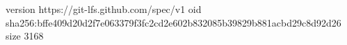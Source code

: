 version https://git-lfs.github.com/spec/v1
oid sha256:bffe409d20d2f7e063379f3fc2cd2e602b832085b39829b881acbd29c8d92d26
size 3168
